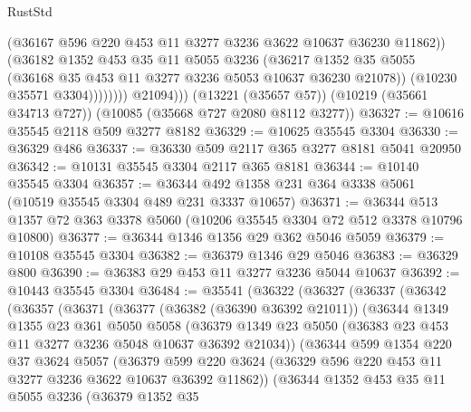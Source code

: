\begin{lexlean}{RustStd}
\begin{coremodule}
                        (@36167 @596 @220 @453 @11 @3277 @3236 @3622 @10637 @36230 @11862))
                      (@36182
                        @1352
                        @453
                        @35
                        @11
                        @5055
                        @3236
                        (@36217
                          @1352
                          @35
                          @5055
                          (@36168 @35 @453 @11 @3277 @3236 @5053 @10637 @36230 @21078))
                        (@10230 @35571 @3304))))))))
          @21094)))
    (@13221 (@35657 @57))
    (@10219 (@35661 @34713 @727))
    (@10085 (@35668 @727 @2080 @8112 @3277))
@36327 := @10616 @35545 @2118 @509 @3277 @8182
@36329 := @10625 @35545 @3304
@36330 := @36329 @486
@36337 := @36330 @509 @2117 @365 @3277 @8181 @5041 @20950
@36342 := @10131 @35545 @3304 @2117 @365 @8181
@36344 := @10140 @35545 @3304
@36357 := @36344 @492 @1358 @231 @364 @3338 @5061 (@10519 @35545 @3304 @489 @231 @3337 @10657)
@36371 := @36344 @513 @1357 @72 @363 @3378 @5060 (@10206 @35545 @3304 @72 @512 @3378 @10796 @10800)
@36377 := @36344 @1346 @1356 @29 @362 @5046 @5059
@36379 := @10108 @35545 @3304
@36382 := @36379 @1346 @29 @5046
@36383 := @36329 @800
@36390 := @36383 @29 @453 @11 @3277 @3236 @5044 @10637
@36392 := @10443 @35545 @3304
@36484 := @35541
    (@36322
      (@36327
        (@36337
          (@36342
            (@36357
              (@36371
                (@36377
                  (@36382 (@36390 @36392 @21011))
                  (@36344
                    @1349
                    @1355
                    @23
                    @361
                    @5050
                    @5058
                    (@36379
                      @1349
                      @23
                      @5050
                      (@36383 @23 @453 @11 @3277 @3236 @5048 @10637 @36392 @21034))
                    (@36344
                      @599
                      @1354
                      @220
                      @37
                      @3624
                      @5057
                      (@36379
                        @599
                        @220
                        @3624
                        (@36329 @596 @220 @453 @11 @3277 @3236 @3622 @10637 @36392 @11862))
                      (@36344
                        @1352
                        @453
                        @35
                        @11
                        @5055
                        @3236
                        (@36379
                          @1352
                          @35

\end{coremodule}
\end{lexlean}
